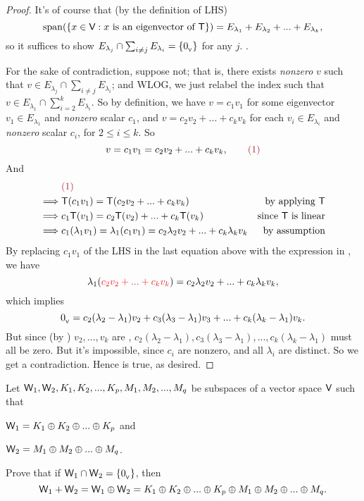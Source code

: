 \begin{proof}
It's of course that (by the definition of LHS)
\[
    \operatorname{span}(\{ x \in \textsf{V}: x \text{ is an eigenvector of } \textsf{T} \}) = E_{\lambda_1} + E_{\lambda_2} + ... + E_{\lambda_k},
\]
so it suffices to show \(E_{\lambda_j} \cap \sum_{i \ne j} E_{\lambda_i} = \{ 0_{_{\textsf{V}}} \}\) for any \(j\). .

For the sake of contradiction, suppose not;
that is, there exists \emph{nonzero} \(v\) such that \(v \in E_{\lambda_j} \cap \sum_{i \ne j} E_{\lambda_i}\);
and WLOG, we just relabel the index such that
\(v \in E_{\lambda_1} \cap \sum_{i = 2}^k E_{\lambda_i}\).
So by definition, we have \(v = c_1 v_1\) for some eigenvector \(v_1 \in E_{\lambda_1}\) and \emph{nonzero} scalar \(c_1\), and \(v = c_2 v_2 + ... + c_k v_k\) for each \(v_i \in E_{\lambda_i}\) and \emph{nonzero} scalar \(c_i\), for \(2 \le i \le k\).
So
\[
    v = c_1 v_1 = c_2 v_2 + ... + c_k v_k, \quad \quad \MAROON{(1)}
\]
And
\begin{align*}
             & \MAROON{(1)} \\
    \implies & \T(c_1 v_1) = \T(c_2 v_2 + ... + c_k v_k) & \text{by applying \(\T\)} \\
    \implies & c_1\T(v_1) = c_2\T(v_2) + ... + c_k\T(v_k) & \text{since \(\T\) is linear} \\
    \implies & c_1 (\lambda_1 v_1) = \lambda_1 (c_1 v_1) = c_2 \lambda_2 v_2 + ... + c_k \lambda_k v_k & \text{by assumption}
\end{align*}
By replacing \(c_1 v_1\) of the LHS in the last equation above with the expression in , we have
\[
    \lambda_1 (\RED{c_2 v_2 + ... + c_k v_k}) = c_2 \lambda_2 v_2 + ... + c_k \lambda_k v_k,
\]
which implies
\[
    0_{_{\textsf{V}}} = c_2 (\lambda_2 - \lambda_1) v_2 + c_3 (\lambda_3 - \lambda_1) v_3 + ... + c_k (\lambda_k - \lambda_1) v_k.
\]
But since (by ) \(v_2, ..., v_k\) are \LID{}, \(c_2(\lambda_2 - \lambda_1), c_3(\lambda_3 - \lambda_1), ..., c_k(\lambda_k - \lambda_1)\) must all be zero.
But it's impossible, since \(c_i\) are nonzero, and all \(\lambda_i\) are distinct.
So we get a contradiction.
Hence  is true, as desired.
\end{proof}

\begin{exercise} \label{exercise 5.2.24}
Let \(\textsf{W}_1, \textsf{W}_2, K_1, K_2, ..., K_p, M_1, M_2, ..., M_q\) be subspaces of a vector space \(\textsf{V}\) such that

 \(\textsf{W}_1 = K_1 \oplus K_2 \oplus ... \oplus K_p\) and

 \(\textsf{W}_2 = M_1 \oplus M_2 \oplus ... \oplus M_q\).

Prove that if  \(\textsf{W}_1 \cap \textsf{W}_2 = \{ 0_{_{\textsf{V}}} \}\), then
\[
    \textsf{W}_1 + \textsf{W}_2 = \textsf{W}_1 \oplus \textsf{W}_2 = K_1 \oplus K_2 \oplus ... \oplus K_p \oplus M_1 \oplus M_2 \oplus ... \oplus M_q.
\]
\end{exercise}

